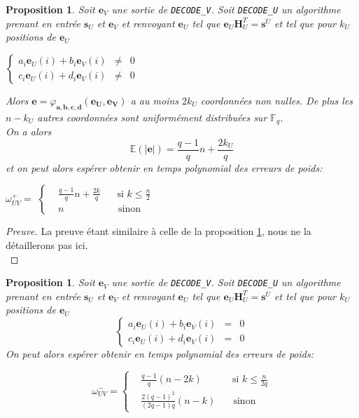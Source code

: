\documentclass[12pt]{article}
\theoremstyle{plain}
\newtheorem{propo}[thm]{Proposition}
\newcommand{\F}{\mathbb{F}}
\begin{document}
\begin{propo} Soit $\mathbf{e}_V$ une sortie de \verb|DECODE_V|. Soit \verb|DECODE_U| un algorithme prenant en entrée $\mathbf{s}_U$ et $\mathbf{e}_V$ et renvoyant $\mathbf{e}_U$ tel que $\mathbf{e}_U\mathbf{H}_U^T = \mathbf{s}^U$ et tel que pour $k_U$ positions de $\mathbf{e}_U$ 
\begin{center}
$\left \{
\begin{array}{rcl}
a_i\mathbf{e}_U(i) + b_i\mathbf{e}_V(i) &\neq& 0 \\
c_i\mathbf{e}_U(i) + d_i\mathbf{e}_V(i) &\neq& 0
\end{array}
\right.$
\end{center}
Alors $\mathbf{e} = \varphi_{\mathbf{a},\mathbf{b},\mathbf{c},\mathbf{d}}(\mathbf{e_U},\mathbf{e_V})$ a au moins $2k_U$ coordonnées non nulles. De plus les $n-k_U$ autres coordonnées sont uniformément distribuées sur $\F_q$. \\
On a alors 
$$ \mathbb{E}(|\mathbf{e}|) = \frac{q-1}{q}n + \frac{2k_U}{q} $$
et on peut alors espérer obtenir en temps polynomial des erreurs de poids:
\begin{center}
$\omega^+_{UV} = $
$\left \{
\begin{array}{rcl}
&\frac{q-1}{q}n + \frac{2k}{q} & \;\; \text{ si } k \leq \frac{n}{2} \\
&n & \quad \text{sinon}
\end{array}
\right.$
\end{center}
\end{propo}

\begin{proof}[Preuve]
La preuve étant similaire à celle de la proposition \ref{Wuv-}, nous ne la détaillerons pas ici.\\
\end{proof}


\begin{propo}\label{Wuv-} Soit $\mathbf{e}_V$ une sortie de \verb|DECODE_V|. Soit \verb|DECODE_U| un algorithme prenant en entrée $\mathbf{s}_U$ et $\mathbf{e}_V$ et renvoyant $\mathbf{e}_U$ tel que $\mathbf{e}_U\mathbf{H}_U^T = \mathbf{s}^U$ et tel que pour $k_U$ positions de $\mathbf{e}_U$ 
\begin{equation}\label{syst petit poid}
\left \{
\begin{array}{rcl}
a_i\mathbf{e}_U(i) + b_i\mathbf{e}_V(i) &=& 0 \\
c_i\mathbf{e}_U(i) + d_i\mathbf{e}_V(i) &=& 0
\end{array}
\right.
\end{equation}
On peut alors espérer obtenir en temps polynomial des erreurs de poids:
\begin{center}
\begin{equation} 
\omega^-_{UV} = 
\left \{
\begin{array}{rcl}
&\frac{q-1}{q}(n-2k) & \;\; \text{ si } k \leq \frac{n}{2q} \\
&\frac{2(q-1)^2}{(2q-1)q}(n-k) & \quad \text{sinon}
\end{array}
\right.
\end{equation}
\end{center}
\end{propo}
\end{document}
